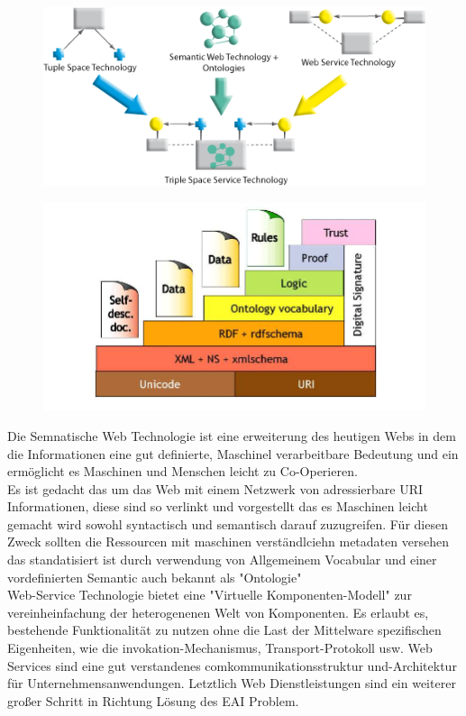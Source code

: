 \documentclass[a4paper,12pt]{scrreprt}
\begin{document}
		

\begin{figure}[h]
\centering
\includegraphics[width=0.7\linewidth]{./tripcom_overview2}
\caption{}
\label{fig:tripcom_overview2}
\end{figure}
\begin{figure}[h]
\centering
\includegraphics[width=0.7\linewidth]{./Semantic_Web_www_tripcom_org_docs_coordination07_paper}
\caption{}
\label{fig:Semantic_Web_www_tripcom_org_docs_coordination07_paper}
\end{figure}
		
		
	
		
		Die Semnatische Web Technologie ist eine erweiterung des heutigen Webs in dem die Informationen eine gut definierte, Maschinel verarbeitbare Bedeutung und ein ermöglicht es Maschinen und Menschen leicht zu Co-Operieren.\\
		Es ist gedacht das um das Web mit einem Netzwerk von adressierbare URI Informationen, diese sind so verlinkt und vorgestellt das es Maschinen leicht gemacht wird sowohl syntactisch und semantisch darauf zuzugreifen.
		Für diesen Zweck sollten die Ressourcen mit maschinen verständlciehn metadaten versehen das standatisiert ist durch verwendung von Allgemeinem Vocabular und einer vordefinierten Semantic auch bekannt als "Ontologie"
		\\
	

		
			
		
		
		Web-Service Technologie bietet eine 
		"Virtuelle Komponenten-Modell" zur vereinheinfachung der 
		heterogenenen Welt von Komponenten. Es  erlaubt es, bestehende Funktionalität zu nutzen 
		ohne die Last der Mittelware spezifischen Eigenheiten, wie die invokation-Mechanismus, Transport-Protokoll usw. Web Services sind eine gut verstandenes comkommunikationsstruktur und-Architektur für Unternehmensanwendungen. Letztlich Web 
		Dienstleistungen sind ein weiterer großer Schritt in Richtung 
		Lösung des EAI Problem.
		
\end{document}
